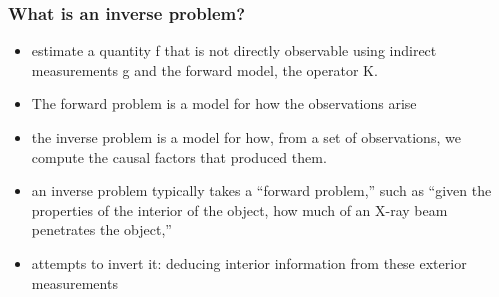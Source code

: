 \documentclass{beamer}
\begin{document}
\begin{frame}
	\frametitle{What is an inverse problem?}
	\begin{itemize}
		\item estimate a quantity f that is not directly observable using indirect measurements g and the forward model, the operator K. 
		 \pause
		\item The forward problem is a model for how the observations arise
		\item the inverse problem is a model for how, from a set of observations, we compute the causal factors that produced them.
		 \pause
\item an inverse problem typically takes a “forward problem,” such
as “given the properties of the interior of the object, how much of an X-ray beam penetrates the object,” 
			\item attempts to invert it: deducing interior information from these exterior measurements 
	\end{itemize}
\end{frame}
\end{document}
